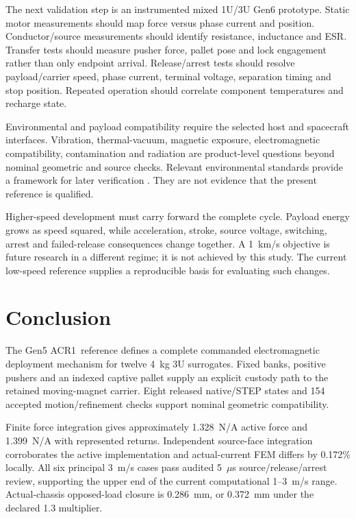 \documentclass[conference,a4paper]{IEEEtran}
\newcommand{\acr}{Gen5 ACR1}
\begin{document}
The next validation step is an instrumented mixed 1U/3U Gen6 prototype. Static motor measurements should map force versus phase current and position. Conductor/source measurements should identify resistance, inductance and ESR. Transfer tests should measure pusher force, pallet pose and lock engagement rather than only endpoint arrival. Release/arrest tests should resolve payload/carrier speed, phase current, terminal voltage, separation timing and stop position. Repeated operation should correlate component temperatures and recharge state.

Environmental and payload compatibility require the selected host and spacecraft interfaces. Vibration, thermal-vacuum, magnetic exposure, electromagnetic compatibility, contamination and radiation are product-level questions beyond nominal geometric and source checks. Relevant environmental standards provide a framework for later verification \cite{gevs}. They are not evidence that the present reference is qualified.

Higher-speed development must carry forward the complete cycle. Payload energy grows as speed squared, while acceleration, stroke, source voltage, switching, arrest and failed-release consequences change together. A 1~km/s objective is future research in a different regime; it is not achieved by this study. The current low-speed reference supplies a reproducible basis for evaluating such changes.

\section{Conclusion}
The \acr\ reference defines a complete commanded electromagnetic deployment mechanism for twelve 4~kg 3U surrogates. Fixed banks, positive pushers and an indexed captive pallet supply an explicit custody path to the retained moving-magnet carrier. Eight released native/STEP states and 154 accepted motion/refinement checks support nominal geometric compatibility.

Finite force integration gives approximately 1.328~N/A active force and 1.399~N/A with represented returns. Independent source-face integration corroborates the active implementation and actual-current FEM differs by 0.172\% locally. All six principal 3~m/s cases pass audited 5~$\mu$s source/release/arrest review, supporting the upper end of the current computational 1--3~m/s range. Actual-chassis opposed-load closure is 0.286~mm, or 0.372~mm under the declared 1.3 multiplier.
\end{document}

